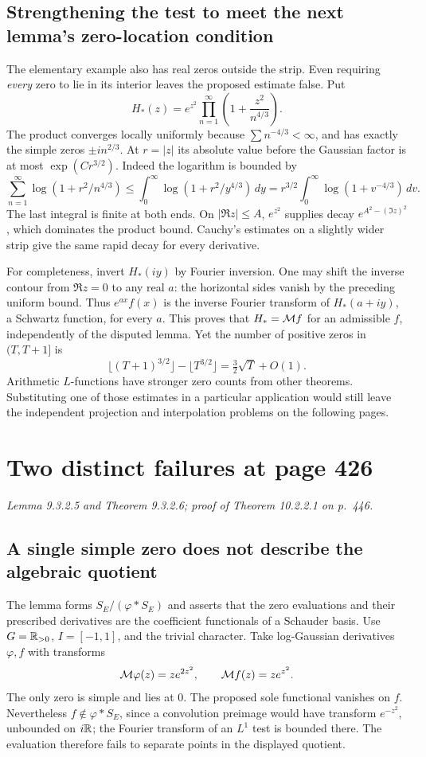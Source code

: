 \documentclass[11pt,reqno]{amsart}
\numberwithin{equation}{section}
\begin{document}
\subsection*{Strengthening the test to meet the next lemma's zero-location condition}
The elementary example also has real zeros outside the strip. Even requiring \emph{every} zero to lie in its interior leaves the proposed estimate false. Put
\[
 H_*(z)=e^{z^2}\prod_{n=1}^\infty\left(1+\frac{z^2}{n^{4/3}}\right).
\]
The product converges locally uniformly because \(\sum n^{-4/3}<\infty\), and has exactly the simple zeros \(\pm i n^{2/3}\). At \(r=|z|\) its absolute value before the Gaussian factor is at most \(\exp(C r^{3/2})\). Indeed the logarithm is bounded by
\[
 \sum_{n=1}^\infty\log(1+r^2/n^{4/3})
 \le\int_0^\infty\log(1+r^2/y^{4/3})\,dy
 =r^{3/2}\int_0^\infty\log(1+v^{-4/3})\,dv .
\]
The last integral is finite at both ends. On \(|\Re z|\le A\), \(e^{z^2}\) supplies decay \(e^{A^2-(\Im z)^2}\), which dominates the product bound. Cauchy's estimates on a slightly wider strip give the same rapid decay for every derivative.

For completeness, invert \(H_*(iy)\) by Fourier inversion. One may shift the inverse contour from \(\Re z=0\) to any real \(a\): the horizontal sides vanish by the preceding uniform bound. Thus \(e^{ax}f(x)\) is the inverse Fourier transform of \(H_*(a+iy)\), a Schwartz function, for every \(a\). This proves that \(H_*=\mathcal M f\) for an admissible \(f\), independently of the disputed lemma. Yet the number of positive zeros in \((T,T+1]\) is
\[
 \lfloor(T+1)^{3/2}\rfloor-\lfloor T^{3/2}\rfloor
 =\tfrac32\sqrt T+O(1).
\]
Arithmetic \(L\)-functions have stronger zero counts from other theorems. Substituting one of those estimates in a particular application would still leave the independent projection and interpolation problems on the following pages.


\section{Two distinct failures at page 426}\label{sec:6}

\textit{Lemma 9.3.2.5 and Theorem 9.3.2.6; proof of Theorem 10.2.2.1 on p.~446.}\par
\subsection*{A single simple zero does not describe the algebraic quotient}
The lemma forms \(S_E/(\varphi*S_E)\) and asserts that the zero evaluations and their prescribed derivatives are the coefficient functionals of a Schauder basis. Use \(G=\mathbb R_{>0}\), \(I=[-1,1]\), and the trivial character. Take log-Gaussian derivatives \(\varphi,f\) with transforms
\[
       \mathcal M\varphi(z)=z e^{2z^2},\qquad \mathcal M f(z)=z e^{z^2}.
\]
The only zero is simple and lies at 0. The proposed sole functional vanishes on \(f\). Nevertheless \(f\notin \varphi*S_E\), since a convolution preimage would have transform \(e^{-z^2}\), unbounded on \(i\mathbb R\); the Fourier transform of an \(L^1\) test is bounded there. The evaluation therefore fails to separate points in the displayed quotient.
\end{document}
